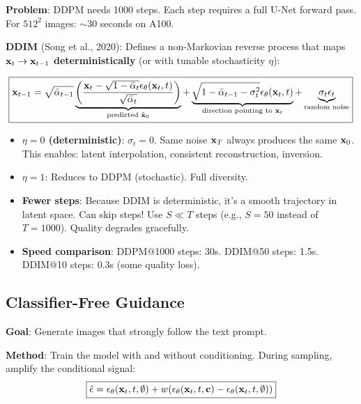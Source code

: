 \textbf{Problem}: DDPM needs 1000 steps. Each step requires a full U-Net forward pass. For $512^2$ images: $\sim$30 seconds on A100.

\textbf{DDIM} (Song et al., 2020): Defines a non-Markovian reverse process that maps $\mathbf{x}_t \to \mathbf{x}_{t-1}$ \textbf{deterministically} (or with tunable stochasticity $\eta$):

\begin{equation}\label{eq:ddim}
\boxed{\mathbf{x}_{t-1} = \sqrt{\bar\alpha_{t-1}}\underbrace{\left(\frac{\mathbf{x}_t - \sqrt{1-\bar\alpha_t}\epsilon_\theta(\mathbf{x}_t,t)}{\sqrt{\bar\alpha_t}}\right)}_{\text{predicted }\hat{\mathbf{x}}_0} + \underbrace{\sqrt{1-\bar\alpha_{t-1}-\sigma_t^2}\epsilon_\theta(\mathbf{x}_t,t)}_{\text{direction pointing to } \mathbf{x}_t} + \underbrace{\sigma_t\epsilon_t}_{\text{random noise}}}
\end{equation}

\begin{keybox}
\begin{itemize}
\item \textbf{$\eta = 0$ (deterministic)}: $\sigma_t = 0$. Same noise $\mathbf{x}_T$ always produces the same $\mathbf{x}_0$. This enables: latent interpolation, consistent reconstruction, inversion.
\item \textbf{$\eta = 1$}: Reduces to DDPM (stochastic). Full diversity.
\item \textbf{Fewer steps}: Because DDIM is deterministic, it's a smooth trajectory in latent space. Can skip steps! Use $S \ll T$ steps (e.g., $S = 50$ instead of $T = 1000$). Quality degrades gracefully.
\item \textbf{Speed comparison}: DDPM@1000 steps: 30s. DDIM@50 steps: 1.5s. DDIM@10 steps: 0.3s (some quality loss).
\end{itemize}
\end{keybox}

\subsection{Classifier-Free Guidance}

\textbf{Goal}: Generate images that strongly follow the text prompt.

\textbf{Method}: Train the model with and without conditioning. During sampling, amplify the conditional signal:
\begin{equation}\label{eq:cfg}
\boxed{\hat\epsilon = \epsilon_\theta(\mathbf{x}_t, t, \emptyset) + w\!\left(\epsilon_\theta(\mathbf{x}_t, t, \mathbf{c}) - \epsilon_\theta(\mathbf{x}_t, t, \emptyset)\right)}
\end{equation}


